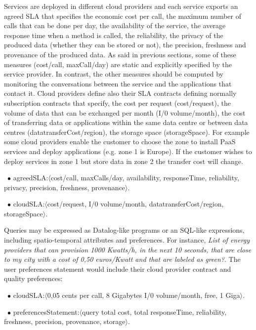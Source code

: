 Services are deployed in different cloud providers and each service exports an agreed SLA that specifies the economic cost per call, the maximum number of calls that can be done per day, the availability of the service, the average response time when a method is called, the reliability, the privacy of the produced data (whether they can be stored or not), the precision, freshness and provenance of the produced data. 
As said in previous sections, some of these measures ({\sf cost/call, maxCall/day}) are static and explicitly specified by the service provider. 
In contrast, the other measures should be computed by monitoring the conversations between the service and the applications that contact it.  
Cloud providers define also their SLA contracts defining normally subscription contracts that specify, the cost per request ({\sf cost/request}), the volume of data that can be exchanged per month ({\sf I/0 volume/month}), the cost of transferring data or applications within the same data centre or between data centres ({\sf datatransferCost/region}), the storage space ({\sf storageSpace}). For example some cloud providers enable the customer to choose the zone to install PaaS services and deploy applications (e.g. zone 1 is Europe). If the customer wishes to deploy services in zone 1 but store data in zone 2 the transfer cost will change.

\begin{trivlist}\sf\footnotesize
\item[~$\bullet$ ] {\sf agreedSLA:$\langle$cost/call, maxCalls/day, availability, responseTime, reliability, privacy, precision, freshness, provenance$\rangle$}. 
 
 \item[~$\bullet$ ]  {\sf cloudSLA:$\langle$cost/request, I/0 volume/month, datatransferCost/region, storageSpace$\rangle$}. 
 \end{trivlist}
 

Queries may be expressed as Datalog-like programs or an SQL-like expressions, including spatio-temporal attributes and preferences.
For instance, \textit{List of energy providers that can provision 1000 Kwatts/h, in the next 10 seconds, that are close to my city with a cost of 0,50 euros/Kwatt and that are labeled as green?}. 
The user preferences statement would include their cloud provider contract and quality preferences:

\begin{trivlist}\sf\footnotesize
\item[~$\bullet$ ]  {\sf cloudSLA:$\langle$0,05 cents per call, 8 Gigabytes I/0 volume/month, free, 1 Giga$\rangle$}. 
\item[~$\bullet$ ] {\sf preferencesStatement:$\langle$query total cost,  total responseTime, reliability, freshness, precision, provenance, storage$\rangle$}. 
\end{trivlist}

